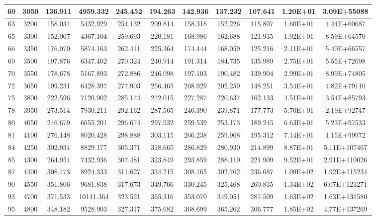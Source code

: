 \documentclass{article}
\begin{document}
\begin{center}
\begin{longtable}{|c|c|c|c|c|c|c|c|c|c|c|}
60	&	3050	&	136.911	&	4959.332	&	245.452	&	194.263	&	142.936	&	137.232	&	107.641	&	1.20E+01	&	3.09E+55088	\\	\hline
63	&	3200	&	158.034	&	5432.929	&	254.132	&	209.814	&	158.318	&	152.226	&	115.807	&	1.60E+01	&	4.44E+60687	\\	\hline
65	&	3300	&	152.067	&	4367.104	&	259.693	&	220.181	&	168.986	&	162.688	&	121.935	&	1.92E+01	&	8.59E+64570	\\	\hline
66	&	3350	&	176.070	&	5874.163	&	262.411	&	225.364	&	174.444	&	168.059	&	125.216	&	2.11E+01	&	5.40E+66557	\\	\hline
69	&	3500	&	197.876	&	6347.402	&	270.324	&	240.914	&	191.314	&	184.735	&	135.989	&	2.75E+01	&	5.55E+72698	\\	\hline
70	&	3550	&	178.678	&	5167.893	&	272.886	&	246.098	&	197.103	&	190.482	&	139.904	&	2.99E+01	&	8.99E+74805	\\	\hline
72	&	3650	&	199.231	&	6428.397	&	277.903	&	256.465	&	208.929	&	202.259	&	148.251	&	3.54E+01	&	4.82E+79110	\\	\hline
75	&	3800	&	222.596	&	7120.902	&	285.174	&	272.015	&	227.287	&	220.637	&	162.133	&	4.51E+01	&	3.54E+85793	\\	\hline
78	&	3950	&	273.514	&	7930.211	&	292.162	&	287.565	&	246.390	&	239.871	&	177.773	&	5.70E+01	&	2.19E+92747	\\	\hline
80	&	4050	&	246.679	&	6655.201	&	296.674	&	297.932	&	259.539	&	253.173	&	189.245	&	6.63E+01	&	5.23E+97533	\\	\hline
81	&	4100	&	276.148	&	8020.428	&	298.888	&	303.115	&	266.238	&	259.968	&	195.312	&	7.14E+01	&	1.15E+99972	\\	\hline
84	&	4250	&	302.934	&	8829.177	&	305.371	&	318.665	&	286.829	&	280.930	&	214.899	&	8.87E+01	&	5.11E+107467	\\	\hline
85	&	4300	&	264.954	&	7432.936	&	307.481	&	323.849	&	293.859	&	288.110	&	221.909	&	9.52E+01	&	2.91E+110026	\\	\hline
87	&	4400	&	308.473	&	8924.333	&	311.627	&	334.215	&	308.165	&	302.762	&	236.687	&	1.09E+02	&	1.92E+115234	\\	\hline
90	&	4550	&	351.806	&	9681.838	&	317.673	&	349.766	&	330.245	&	325.468	&	260.835	&	1.34E+02	&	6.07E+123271	\\	\hline
93	&	4700	&	371.533	&	10141.364	&	323.521	&	365.316	&	353.070	&	349.051	&	287.509	&	1.63E+02	&	1.63E+131580	\\	\hline
95	&	4800	&	348.182	&	9528.903	&	327.317	&	375.682	&	368.699	&	365.262	&	306.777	&	1.85E+02	&	4.77E+137269	\\	\hline

\end{longtable}
\end{center}
\end{document}
